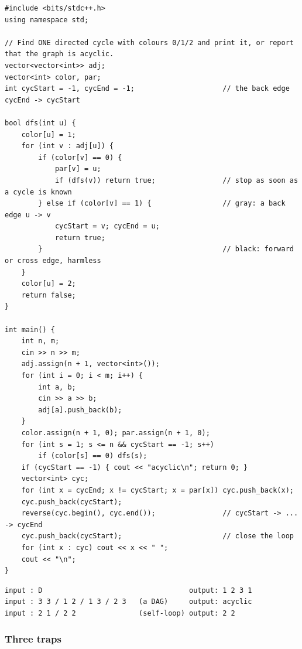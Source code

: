 \begin{lstlisting}[style=cpp]
#include <bits/stdc++.h>
using namespace std;

// Find ONE directed cycle with colours 0/1/2 and print it, or report that the graph is acyclic.
vector<vector<int>> adj;
vector<int> color, par;
int cycStart = -1, cycEnd = -1;                     // the back edge cycEnd -> cycStart

bool dfs(int u) {
    color[u] = 1;
    for (int v : adj[u]) {
        if (color[v] == 0) {
            par[v] = u;
            if (dfs(v)) return true;                // stop as soon as a cycle is known
        } else if (color[v] == 1) {                 // gray: a back edge u -> v
            cycStart = v; cycEnd = u;
            return true;
        }                                           // black: forward or cross edge, harmless
    }
    color[u] = 2;
    return false;
}

int main() {
    int n, m;
    cin >> n >> m;
    adj.assign(n + 1, vector<int>());
    for (int i = 0; i < m; i++) {
        int a, b;
        cin >> a >> b;
        adj[a].push_back(b);
    }
    color.assign(n + 1, 0); par.assign(n + 1, 0);
    for (int s = 1; s <= n && cycStart == -1; s++)
        if (color[s] == 0) dfs(s);
    if (cycStart == -1) { cout << "acyclic\n"; return 0; }
    vector<int> cyc;
    for (int x = cycEnd; x != cycStart; x = par[x]) cyc.push_back(x);
    cyc.push_back(cycStart);
    reverse(cyc.begin(), cyc.end());                // cycStart -> ... -> cycEnd
    cyc.push_back(cycStart);                        // close the loop
    for (int x : cyc) cout << x << " ";
    cout << "\n";
}
\end{lstlisting}

\begin{lstlisting}[style=trace]
input : D                                   output: 1 2 3 1
input : 3 3 / 1 2 / 1 3 / 2 3   (a DAG)     output: acyclic
input : 2 1 / 2 2               (self-loop) output: 2 2
\end{lstlisting}

\subsubsection*{Three traps}

